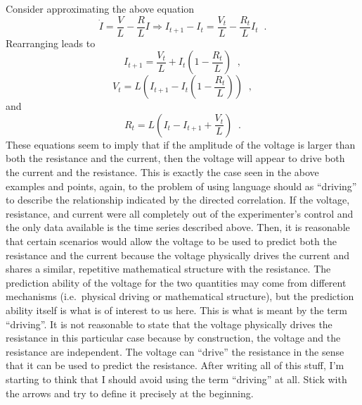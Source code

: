 \documentclass[a4paper,11pt]{article}
\begin{document}
Consider approximating the above equation
$$
\dot{I} = \frac{V}{L} - \frac{R}{L} I\Rightarrow I_{t+1}-I_t = \frac{V_t}{L} - \frac{R_t}{L} I_t\;\;.
$$
Rearranging leads to
$$
I_{t+1} = \frac{V_t}{L}+I_t\left(1-\frac{R_t}{L}\right)\;\;,
$$
$$
V_t = L\left(I_{t+1}-I_t\left(1-\frac{R_t}{L}\right)\right)\;\;,
$$
and
$$
R_t = L\left(I_t-I_{t+1}+\frac{V_t}{L}\right)\;\;.
$$
These equations seem to imply that if the amplitude of the voltage is larger than both the resistance and the current, then the voltage will appear to drive both the current and the resistance.  This is exactly the case seen in the above examples and points, again, to the problem of using language should as ``driving'' to describe the relationship indicated by the directed correlation.  If the voltage, resistance, and current were all completely out of the experimenter's control and the only data available is the time series described above.  Then, it is reasonable that certain scenarios would allow the voltage to be used to predict both the resistance and the current because the voltage physically drives the current and shares a similar, repetitive mathematical structure with the resistance.  The prediction ability of the voltage for the two quantities may come from different mechanisms (i.e.\ physical driving or mathematical structure), but the prediction ability itself is what is of interest to us here.  This is what is meant by the term ``driving''.  It is not reasonable to state that the voltage physically drives the resistance in this particular case because by construction, the voltage and the resistance are independent.  The voltage can ``drive'' the resistance in the sense that it can be used to predict the resistance.  After writing all of this stuff, I'm starting to think that I should avoid using the term ``driving'' at all.  Stick with the arrows and try to define it precisely at the beginning.
\end{document}
